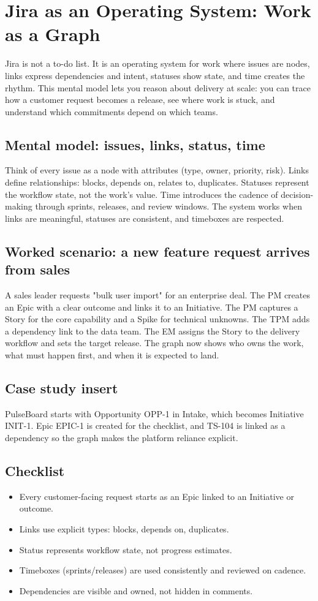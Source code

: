 \section{Jira as an Operating System: Work as a Graph}
Jira is not a to-do list. It is an operating system for work where issues are nodes, links express dependencies and intent, statuses show state, and time creates the rhythm. This mental model lets you reason about delivery at scale: you can trace how a customer request becomes a release, see where work is stuck, and understand which commitments depend on which teams.

\subsection{Mental model: issues, links, status, time}
Think of every issue as a node with attributes (type, owner, priority, risk). Links define relationships: blocks, depends on, relates to, duplicates. Statuses represent the workflow state, not the work's value. Time introduces the cadence of decision-making through sprints, releases, and review windows. The system works when links are meaningful, statuses are consistent, and timeboxes are respected.

\subsection{Worked scenario: a new feature request arrives from sales}
A sales leader requests "bulk user import" for an enterprise deal. The PM creates an Epic with a clear outcome and links it to an Initiative. The PM captures a Story for the core capability and a Spike for technical unknowns. The TPM adds a dependency link to the data team. The EM assigns the Story to the delivery workflow and sets the target release. The graph now shows who owns the work, what must happen first, and when it is expected to land.

\subsection{Case study insert}
PulseBoard starts with Opportunity OPP-1 in Intake, which becomes Initiative INIT-1. Epic EPIC-1 is created for the checklist, and TS-104 is linked as a dependency so the graph makes the platform reliance explicit.
\subsection{Checklist}
\begin{itemize}
  \item Every customer-facing request starts as an Epic linked to an Initiative or outcome.
  \item Links use explicit types: blocks, depends on, duplicates.
  \item Status represents workflow state, not progress estimates.
  \item Timeboxes (sprints/releases) are used consistently and reviewed on cadence.
  \item Dependencies are visible and owned, not hidden in comments.
\end{itemize}

